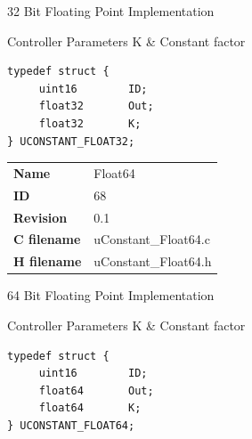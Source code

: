 32 Bit Floating Point Implementation

\begin{XtoCtabular}{Controller Parameters}
K & Constant factor\tabularnewline
\hline
\end{XtoCtabular}

\begin{lstlisting}
typedef struct {
     uint16        ID;
     float32       Out;
     float32       K;
} UCONSTANT_FLOAT32;
\end{lstlisting}

\ifdefined \AddTestReports
{}
\fi
{}
\nopagebreak[0]
\begin{tabular}{l l}
\textbf{Name} & Float64 \tabularnewline
\textbf{ID} & 68 \tabularnewline
\textbf{Revision} & 0.1 \tabularnewline
\textbf{C filename} & uConstant\_Float64.c \tabularnewline
\textbf{H filename} & uConstant\_Float64.h \tabularnewline
\end{tabular}
\vspace{1ex}

64 Bit Floating Point Implementation

\begin{XtoCtabular}{Controller Parameters}
K & Constant factor\tabularnewline
\hline
\end{XtoCtabular}

\begin{lstlisting}
typedef struct {
     uint16        ID;
     float64       Out;
     float64       K;
} UCONSTANT_FLOAT64;
\end{lstlisting}

\ifdefined \AddTestReports
{}
\fi
